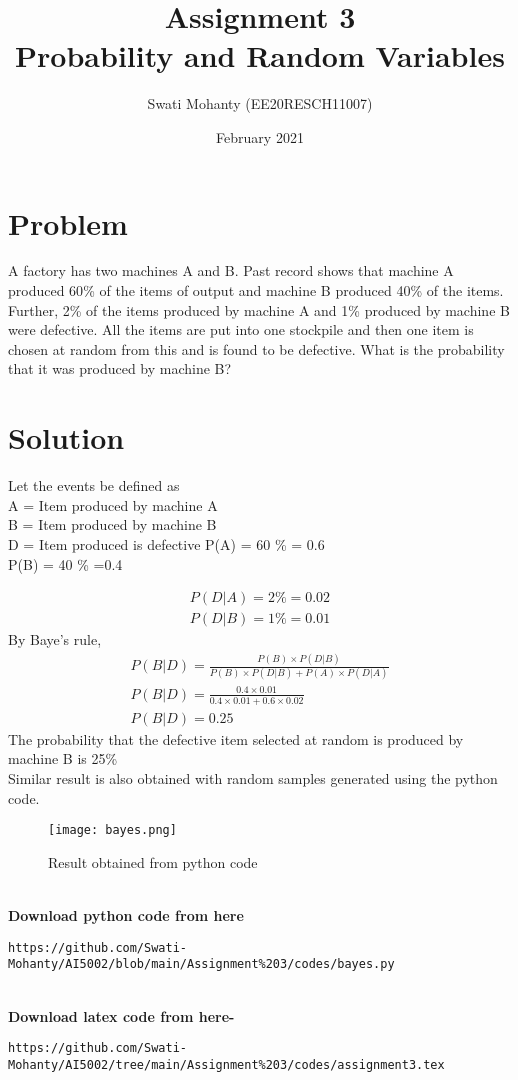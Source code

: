 \documentclass[journal,12pt,twocolumn]{IEEEtran}
\title{Assignment 3
\\Probability and Random Variables }
\author{Swati Mohanty (EE20RESCH11007) }
\date{February 2021}
\begin{document}
\maketitle


\section{Problem}
A factory has two machines A and B. Past
record shows that machine A produced
60{\%} of the items of output and machine
B produced 40{\%} of the items. Further, 2{\%}
of the items produced by machine A and
1{\%} produced by machine B were defective.
All the items are put into one stockpile and
then one item is chosen at random from this
and is found to be defective. What is the
probability that it was produced by machine B?

\section{Solution}
Let the events be defined as
\\A = Item produced by machine A
\\B = Item produced by machine B
\\D = Item produced is defective
P(A) = 60 {\%} = 0.6\\
P(B) = 40 {\%} =0.4

\begin{align}
    P(D|A)  = 2 {\%} =0.02
   \\P(D|B) =  1 {\%} =0.01
\end{align}
By Baye's rule,
\begin{align}
    P(B|D) = \frac{P(B)\times P(D|B)}{P(B)\times P(D|B) + P(A)\times P(D|A)}
    \\P(B|D) = \frac{0.4\times 0.01}{0.4\times 0.01 + 0.6\times 0.02}
    \\P(B|D) = 0.25
\end{align}
The probability that the defective item selected at random is produced by machine B is 25{\%}
\\Similar  result is also obtained with random samples generated using the python code.
\begin{figure}[h]
\renewcommand{\theenumi}{1}
\centering
\texttt{[image: bayes.png]}
\caption{Result obtained from python code }
\label{Fig:1}
\end{figure}
\\\textbf{Download python code from here}\\
\begin{lstlisting}
https://github.com/Swati-Mohanty/AI5002/blob/main/Assignment%203/codes/bayes.py
\end{lstlisting}
\\\textbf{Download latex code from here-}\\
\begin{lstlisting}
https://github.com/Swati-Mohanty/AI5002/tree/main/Assignment%203/codes/assignment3.tex
\end{lstlisting}
\end{document}
